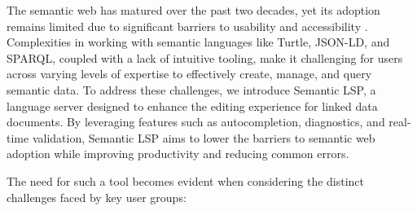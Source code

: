 The semantic web has matured over the past two decades, yet its adoption remains limited due to significant barriers to usability and accessibility \cite{10.3233/SW-190387}. 
Complexities in working with semantic languages like Turtle, JSON-LD, and SPARQL, coupled with a lack of intuitive tooling, make it challenging for users across varying levels of expertise to effectively create, manage, and query semantic data. 
To address these challenges, we introduce Semantic LSP, a language server designed to enhance the editing experience for linked data documents. 
By leveraging features such as autocompletion, diagnostics, and real-time validation, Semantic LSP aims to lower the barriers to semantic web adoption while improving productivity and reducing common errors.

The need for such a tool becomes evident when considering the distinct challenges faced by key user groups:

